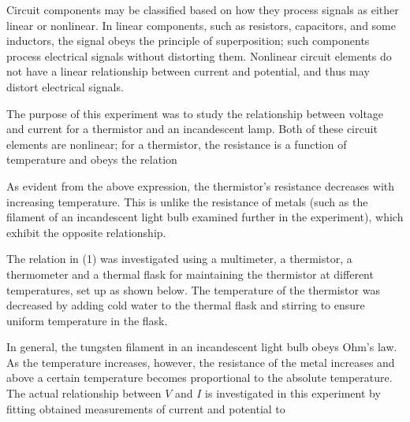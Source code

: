\begin{paper}
	

	Circuit components may be classified based on how they process signals as either linear or nonlinear. In linear components, such as resistors, capacitors, and some inductors, the signal obeys the principle of superposition; such components process electrical signals without distorting them. Nonlinear circuit elements do not have a linear relationship between current and potential, and thus may distort electrical signals. 
	
	The purpose of this experiment was to study the relationship between voltage and current for a thermistor and an incandescent lamp. Both of these circuit elements are nonlinear; for a thermistor, the resistance is a function of temperature and obeys the relation
	
	\begin{paperwhere}
	\end{paperwhere}

	As evident from the above expression, the thermistor's resistance decreases with increasing temperature. This is unlike the resistance of metals (such as the filament of an incandescent light bulb examined further in the experiment), which exhibit the opposite relationship.

	The relation in (1) was investigated using a multimeter, a thermistor, a thermometer and a thermal flask for maintaining the thermistor at different temperatures, set up as shown below. The temperature of the thermistor was decreased by adding cold water to the thermal flask and stirring to ensure uniform temperature in the flask. \vspace{-0.8em}
	
	
	In general, the tungsten filament in an incandescent light bulb obeys Ohm's law. As the temperature increases, however, the resistance of the metal increases and above a certain temperature becomes proportional to the absolute temperature. The actual relationship between \( V \) and \( I \) is investigated in this experiment by fitting obtained measurements of current and potential to 
	

\end{paper}
